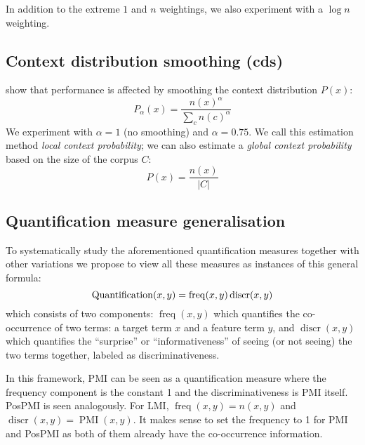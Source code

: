 In addition to the extreme $1$ and $n$ weightings, we also experiment with a $\log n$ weighting.

\subsection{Context distribution smoothing (cds)}
\label{sec:cont-distr-smooth}

 show that performance is affected by smoothing the context distribution $P(x)$:
%
\begin{equation}
  \label{eq:cds}
  P_{\alpha}(x) = \frac{n(x)^{\alpha}}{\sum_{c}n(c)^{\alpha}}
\end{equation}
%
We experiment with $\alpha=1$ (no smoothing) and $\alpha = 0.75$. We call this estimation method \emph{local context probability}; we can also estimate a \emph{global context probability} based on the size of the corpus $C$:
%
\begin{equation}
  \label{eq:cds-nan}
  P(x) = \frac{n(x)}{|C|}
\end{equation}

\subsection{Quantification measure generalisation}
\label{sec:quantification-measures}

To systematically study the aforementioned quantification measures together with other variations we propose to view all these measures as instances of this general formula:
%
\begin{equation}
  \small
  \label{eq:association}
  \operatorname{Quantification}(x,y) = \operatorname{freq}(x, y)
                                       \operatorname{discr}(x, y)
\end{equation}
%
which consists of two components: $\operatorname{freq}(x, y)$ which quantifies the co-occurrence of two terms: a target term $x$ and a feature term $y$, and $\operatorname{discr}(x, y)$ which quantifies the ``surprise'' or ``informativeness'' of seeing (or not seeing) the two terms together,  labeled as discriminativeness.

In this framework, PMI can be seen as a quantification measure where the frequency component is the constant 1 and the discriminativeness is PMI itself. PosPMI is seen analogously. For LMI, $\operatorname{freq}(x, y) = n(x, y)$ and $\operatorname{discr}(x, y) = \operatorname{PMI}(x, y)$. It makes sense to set the frequency to 1 for PMI and PosPMI as both of them already have the co-occurrence information.

